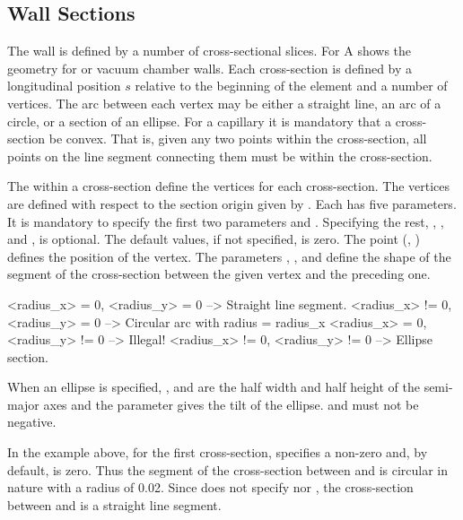 \subsection{Wall Sections}
\label{s:wall.section}

The wall is defined by a number of cross-sectional slices. For A shows the
geometry for  or vacuum chamber walls.  Each cross-section is defined by a
longitudinal position $s$ relative to the beginning of the element and a number of vertices. The arc
between each vertex may be either a straight line, an arc of a circle, or a section of an
ellipse. For a capillary it is mandatory that a cross-section be convex. That is, given any two
points within the cross-section, all points on the line segment connecting them must be within the
cross-section.

The  within a cross-section define the vertices for each cross-section. The vertices are
defined with respect to the section origin given by . Each  has five
parameters. It is mandatory to specify the first two parameters  and . Specifying
the rest, , , and , is optional. The default values, if not
specified, is zero. The point (, ) defines the position of the vertex. The
parameters , , and  define the shape of the segment of the
cross-section between the given vertex and the preceding one.
\begin{example}
  <radius_x>  = 0, <radius_y>  = 0   --> Straight line segment.
  <radius_x> != 0, <radius_y>  = 0   --> Circular arc with radius = radius_x
  <radius_x>  = 0, <radius_y> != 0   --> Illegal!
  <radius_x> != 0, <radius_y> != 0   --> Ellipse section.
\end{example}
When an ellipse is specified, , and  are
the half width and half height of the semi-major axes and the
 parameter gives the tilt of the ellipse. 
and  must not be negative.

In the example above, for the first cross-section,  specifies a non-zero 
and, by default,  is zero. Thus the segment of the cross-section between 
and  is circular in nature with a radius of 0.02. Since  does not specify
 nor , the cross-section between  and  is a straight
line segment.

